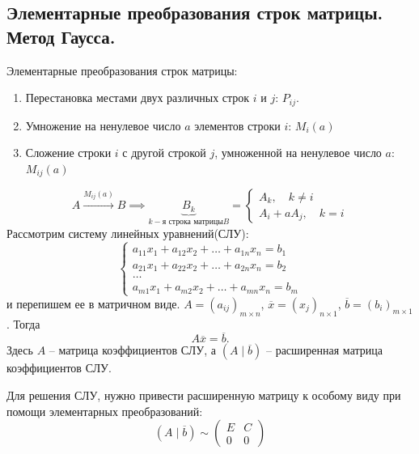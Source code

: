 \documentclass[12pt, a4paper]{article}
\begin{document}
    \subsection{Элементарные преобразования строк матрицы. Метод Гаусса.}
    \begin{definition}
        Элементарные преобразования строк матрицы: 
        \begin{enumerate}
            \item Перестановка местами двух различных строк \( i \) и \( j \): \( P_{ij} \).
            \item Умножение на ненулевое число \( a \) элементов строки \( i \): \( M_{i}(a) \)
            \item Сложение строки \( i \) с другой строкой \( j \), умноженной на ненулевое число \( a \): \( M_{ij}(a) \)
        \end{enumerate}
    \end{definition}

    \[
        A \xrightarrow{M_{ij}(a)}B \implies \underbrace{B_{k}}_{k-\text{я строка матрицы} B} = \begin{cases}
            A_{k}, \quad k \neq  i \\
            A_{i} + a A_{j}, \quad k =i
        \end{cases}
    \] Рассмотрим систему линейных уравнений(СЛУ): \[
        \begin{cases}
            a_{11}x_{1} + a_{12}x_{2} + \ldots  + a_{1n}x_{n} = b_{1} \\
            a_{21}x_{1} + a_{22}x_{2} + \ldots  + a_{2n}x_{n} = b_{2} \\
            \ldots \\
            a_{m1}x_{1} + a_{m2}x_{2} + \ldots  + a_{mn}x_{n} = b_{m}
        \end{cases}
    \] и перепишем ее в матричном виде. \( A = (a_{ij})_{m\times n} \), \( \overline{x} = (x_{j})_{n\times 1} \), \( \overline{b} = (b_{i})_{m\times 1} \). Тогда \[
    A\overline{x} = \overline{b}.
    \] Здесь \( A \) -- матрица коэффициентов СЛУ, а \( (A \mid  \overline{b}) \) -- расширенная матрица коэффициентов СЛУ.

    Для решения СЛУ, нужно привести расширенную матрицу к особому виду при помощи элементарных преобразований: \[
        (A \mid \overline{b}) \sim  \begin{pmatrix} E & C \\ 0 & 0 \end{pmatrix} 
    \] 
\end{document}
